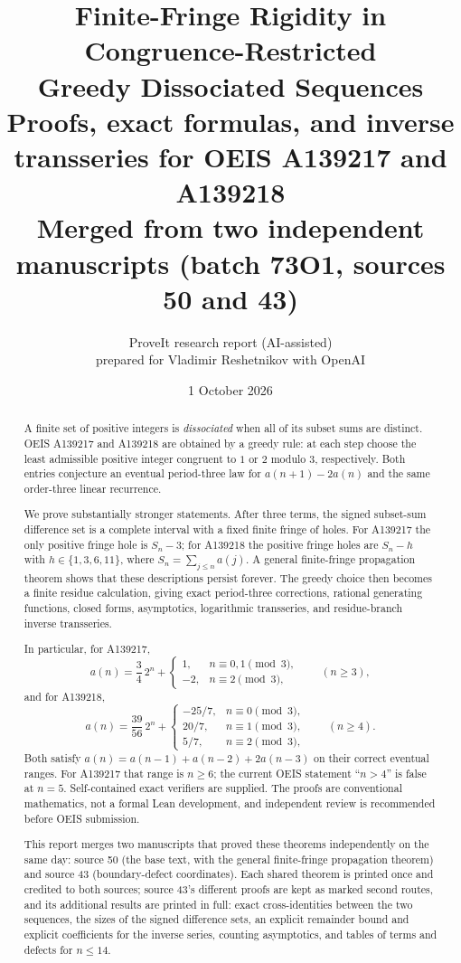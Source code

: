 \documentclass[11pt,a4paper]{article}
\title{Finite-Fringe Rigidity in Congruence-Restricted\\
Greedy Dissociated Sequences\\[6pt]
\large Proofs, exact formulas, and inverse transseries for OEIS A139217 and A139218\\[4pt]
\normalsize Merged from two independent manuscripts (batch 73O1, sources 50 and 43)}
\author{ProveIt research report (AI-assisted)\\
prepared for Vladimir Reshetnikov with OpenAI}
\date{1 October 2026}
\numberwithin{equation}{section}
\theoremstyle{definition}
\theoremstyle{remark}
\theoremstyle{plain}
\begin{document}
\maketitle

\begin{abstract}
A finite set of positive integers is \emph{dissociated} when all of its subset
sums are distinct.  OEIS A139217 and A139218 are obtained by a greedy rule:
at each step choose the least admissible positive integer congruent to $1$ or
$2$ modulo $3$, respectively.  Both entries conjecture an eventual period-three
law for $a(n+1)-2a(n)$ and the same order-three linear recurrence.

We prove substantially stronger statements.  After three terms, the signed
subset-sum difference set is a complete interval with a fixed finite fringe of
holes.  For A139217 the only positive fringe hole is $S_n-3$; for A139218 the
positive fringe holes are $S_n-h$ with $h\in\{1,3,6,11\}$, where
$S_n=\sum_{j\le n}a(j)$.  A general finite-fringe propagation theorem shows
that these descriptions persist forever.  The greedy choice then becomes a
finite residue calculation, giving exact period-three corrections, rational
generating functions, closed forms, asymptotics, logarithmic transseries, and
residue-branch inverse transseries.

In particular, for A139217,
\[
 a(n)=\frac34\,2^n+
 \begin{cases}1,&n\equiv0,1\pmod3,\\-2,&n\equiv2\pmod3,
 \end{cases}
 \qquad(n\ge3),
\]
and for A139218,
\[
 a(n)=\frac{39}{56}\,2^n+
 \begin{cases}-25/7,&n\equiv0\pmod3,\\20/7,&n\equiv1\pmod3,\\5/7,&n\equiv2\pmod3,
 \end{cases}
 \qquad(n\ge4).
\]
Both satisfy $a(n)=a(n-1)+a(n-2)+2a(n-3)$ on their correct eventual ranges.
For A139217 that range is $n\ge6$; the current OEIS statement ``$n>4$'' is
false at $n=5$.  Self-contained exact verifiers are supplied.  The proofs are
conventional mathematics, not a formal Lean development, and independent
review is recommended before OEIS submission.

This report merges two manuscripts that proved these theorems independently
on the same day: source 50 (the base text, with the general finite-fringe
propagation theorem) and source 43 (boundary-defect coordinates).  Each shared
theorem is printed once and credited to both sources; source 43's different
proofs are kept as marked second routes, and its additional results are
printed in full: exact cross-identities between the two sequences, the sizes
of the signed difference sets, an explicit remainder bound and explicit
coefficients for the inverse series, counting asymptotics, and tables of
terms and defects for $n\le14$.
\end{abstract}
\end{document}
